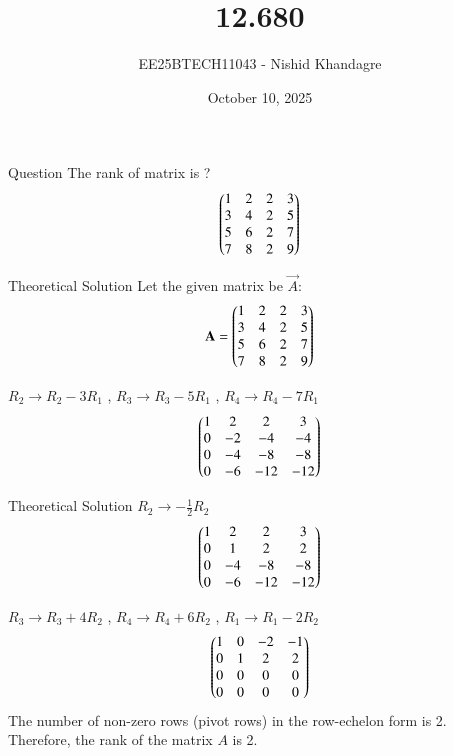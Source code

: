 \documentclass{beamer}
\title
{12.680}
\date{October 10, 2025}
\author
{EE25BTECH11043 - Nishid Khandagre}
\begin{document}
\frame{\titlepage}

\begin{frame}{Question}
The rank of matrix is ?
\begin{align*}
\begin{pmatrix}
1 & 2 & 2 & 3\\
3 & 4 & 2 & 5\\
5 & 6 & 2 & 7\\
7 & 8 & 2 & 9
\end{pmatrix}
\end{align*}
\end{frame}

\begin{frame}{Theoretical Solution}
Let the given matrix be $\vec{A}$:
\begin{align}
\mathbf{A}=\begin{pmatrix}
1 & 2 & 2 & 3\\
3 & 4 & 2 & 5\\
5 & 6 & 2 & 7\\
7 & 8 & 2 & 9
\end{pmatrix}
\end{align}

$R_2 \rightarrow R_2-3R_1$ , $R_3 \rightarrow R_3-5R_1$ , $R_4 \rightarrow R_4-7R_1$
    \begin{align}
    \begin{pmatrix}
    1 & 2 & 2 & 3\\
    0 & -2 & -4 & -4\\
    0 & -4 & -8 & -8\\
    0 & -6 & -12 & -12
    \end{pmatrix}
    \end{align}
\end{frame}

\begin{frame}{Theoretical Solution}
$R_2 \rightarrow -\frac{1}{2}R_2$ 
    \begin{align}
    \begin{pmatrix}
    1 & 2 & 2 & 3\\
    0 & 1 & 2 & 2\\
    0 & -4 & -8 & -8\\
    0 & -6 & -12 & -12
    \end{pmatrix}
    \end{align}

$R_3 \rightarrow R_3+4R_2$ , $R_4 \rightarrow R_4+6R_2$ , $R_1 \rightarrow R_1-2R_2$
    \begin{align}
    \begin{pmatrix}
    1 & 0 & -2 & -1\\
    0 & 1 & 2 & 2\\
    0 & 0 & 0 & 0\\
    0 & 0 & 0 & 0
    \end{pmatrix}
    \end{align}
The number of non-zero rows (pivot rows) in the row-echelon form is 2.
Therefore, the rank of the matrix $A$ is 2.
\end{frame}
\end{document}
